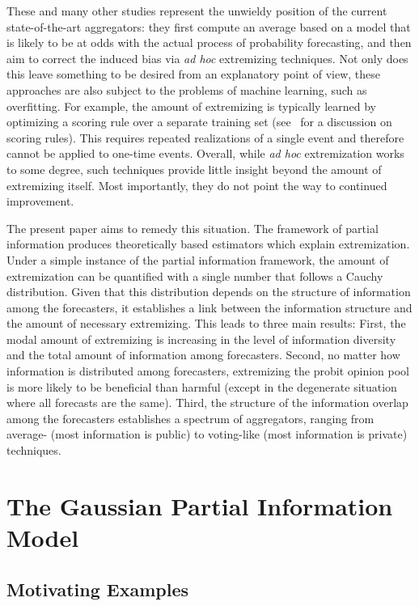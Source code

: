\documentclass[11pt]{article}
\theoremstyle{definition}
\theoremstyle{definition}
\begin{document}
These and many other studies represent the unwieldy position of the
 current state-of-the-art aggregators: they first compute an average 
 based on a model that is
likely to be at odds with the actual process of probability
forecasting, and  then aim to correct the induced bias  via {\em ad hoc}
extremizing techniques.
%
Not only does this leave something to be desired from an explanatory
point of view, these approaches are also subject to the problems of
machine learning, such as overfitting.  For example, the amount of 
extremizing is typically learned by optimizing a
scoring rule over a separate training set
(see~\citealt{Gneiting04strictlyproper} for a discussion on scoring
rules).  This requires repeated realizations
of a single event and therefore cannot be applied to one-time events. Overall, while {\em ad hoc}
extremization works to some degree, such techniques provide little
insight beyond the amount of extremizing itself. Most importantly, they do not point
the way to continued improvement.

The present paper aims to remedy this situation.  The framework of
partial information produces theoretically based estimators which
explain extremization. Under a simple instance of the partial
information framework, the amount of extremization can be quantified
with a single number that follows a Cauchy distribution.  Given that
this distribution depends on the structure of information among the
forecasters, it establishes a link between the information structure
and the amount of necessary extremizing.  This leads to three main results:  First, the modal
amount of extremizing is increasing in the level of information
diversity and the total amount of information among forecasters.
Second, no matter how information is distributed among forecasters,
extremizing the probit opinion pool is more likely to be beneficial
than harmful (except in the degenerate situation where all forecasts
are the same). Third, the structure of the information overlap among
the forecasters establishes a spectrum of aggregators, ranging from
average- (most information is public) to voting-like (most information
is private) techniques.


\section{The Gaussian Partial Information Model}
\label{sec:model}

\subsection{Motivating Examples}
\end{document}
